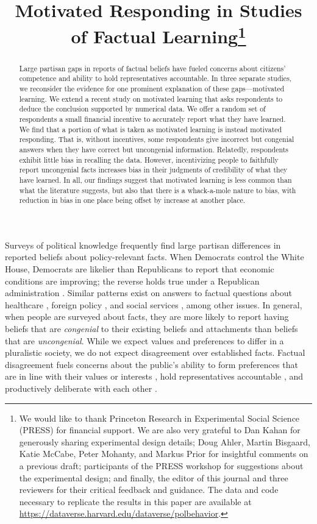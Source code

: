 \documentclass[12pt, letterpaper]{article}
\title{\large{Motivated Responding in Studies of Factual Learning}\footnote{We would like to thank Princeton Research in Experimental Social Science (PRESS) for financial support.
We are also very grateful to Dan Kahan for generously sharing experimental design details; Doug Ahler, Martin Bisgaard, Katie McCabe, Peter Mohanty, and Markus Prior for insightful comments on a previous draft; participants of the PRESS workshop for suggestions about the experimental design; and finally, the editor of this journal and three reviewers for their critical feedback and guidance.
The data and code necessary to replicate the results in this paper are available at \href{https://dataverse.harvard.edu/dataverse/polbehavior}{https://dataverse.harvard.edu/dataverse/polbehavior}.}}
\begin{document}
\maketitle
\thispagestyle{empty}

\begin{abstract}
\noindent Large partisan gaps in reports of factual beliefs have fueled concerns about citizens' competence and ability to hold representatives accountable. In three separate studies, we reconsider the evidence for one prominent explanation of these gaps---motivated learning. We extend a recent study on motivated learning that asks respondents to deduce the conclusion supported by numerical data. We offer a random set of respondents a small financial incentive to accurately report what they have learned. We find that a portion of what is taken as motivated learning is instead motivated responding. That is, without incentives, some respondents give incorrect but congenial answers when they have correct but uncongenial information. Relatedly, respondents exhibit little bias in recalling the data. However, incentivizing people to faithfully report uncongenial facts increases bias in their judgments of credibility of what they have learned. In all, our findings suggest that motivated learning is less common than what the literature suggests, but also that there is a whack-a-mole nature to bias, with reduction in bias in one place being offset by increase at another place.
\end{abstract}

\newpage
\doublespacing
\setcounter{page}{1}

Surveys of political knowledge frequently find large partisan differences in reported beliefs about policy-relevant facts. When Democrats control the White House, Democrats are likelier than Republicans to report that economic conditions are improving; the reverse holds true under a Republican administration \citep{bartels2002}. Similar patterns exist on answers to factual questions about healthcare \citep[e.g.,][]{nyhan2010}, foreign policy \citep[e.g.,][]{jacobson2010}, and social services \citep[e.g.,][]{jerit2012}, among other issues. In general, when people are surveyed about facts, they are more likely to report having beliefs that are {\it congenial} to their existing beliefs and attachments than beliefs that are {\it uncongenial}. While we expect values and preferences to differ in a pluralistic society, we do not expect disagreement over established facts. Factual disagreement fuels concerns about the public's ability to form preferences that are in line with their values or interests \citep[e.g.,][]{hochschild2001}, hold representatives accountable \citep[e.g.,][]{bartels2002}, and productively deliberate with each other \citep[][]{shapiro2008, muirhead2013}.
\end{document}
